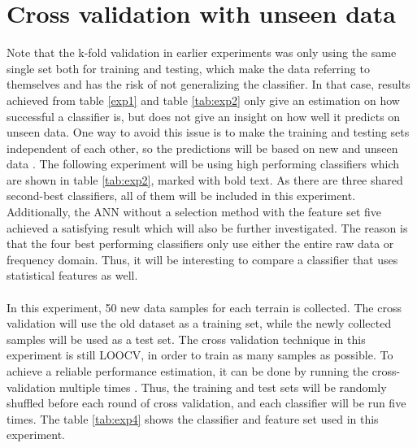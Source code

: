 \documentclass[USenglish]{ifimaster}  %
\begin{document}
\section{Cross validation with unseen data} \label{seq:crossunseen}
Note that the k-fold validation in earlier experiments was only using the same single set both for training and testing, which make the data referring to themselves and has the risk of not generalizing the classifier. In that case, results achieved from table \ref{exp1} and table \ref{tab:exp2} only give an estimation on how successful a classifier is, but does not give an insight on how well it predicts on unseen data. One way to avoid this issue is to make the training and testing sets independent of each other, so the predictions will be based on new and unseen data \cite{26b23e912c654fe4b7478fd910130195}. The following experiment will be using high performing classifiers which are shown in table \ref{tab:exp2}, marked with bold text. As there are three shared second-best classifiers, all of them will be included in this experiment. Additionally, the ANN without a selection method with the feature set five achieved a satisfying result which will also be further investigated. The reason is that the four best performing classifiers only use either the entire raw data or frequency domain. Thus, it will be interesting to compare a classifier that uses statistical features as well.
\\
\\
In this experiment, 50 new data samples for each terrain is collected. The cross validation will use the old dataset as a training set, while the newly collected samples will be used as a test set. The cross validation technique in this experiment is still LOOCV, in order to train as many samples as possible. To achieve a reliable performance estimation, it can be done by running the cross-validation multiple times \cite{Refaeilzadeh2009}. Thus, the training and test sets will be randomly shuffled before each round of cross validation, and each classifier will be run five times. The table \ref{tab:exp4} shows the classifier and feature set used in this experiment.
\end{document}
